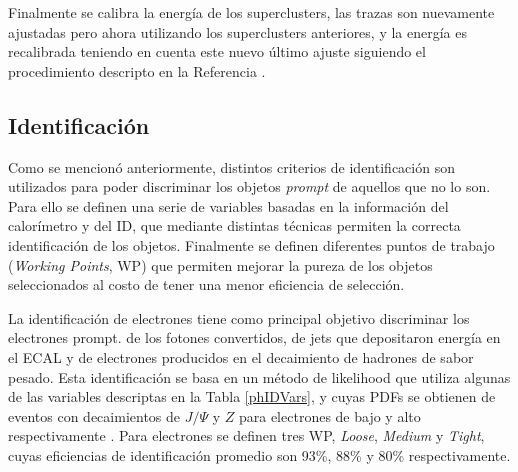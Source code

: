 Finalmente se calibra la energía de los superclusters, las trazas son nuevamente ajustadas pero ahora utilizando los superclusters anteriores, y la energía es recalibrada teniendo en cuenta este nuevo último ajuste siguiendo el procedimiento descripto en la Referencia \cite{PERF-2017-03}.


\subsection{Identificación}

Como se mencionó anteriormente, distintos criterios de identificación son utilizados para poder discriminar los objetos \textit{prompt}
de aquellos que no lo son. Para ello se definen una serie de variables basadas en la información del calorímetro y del ID, que mediante distintas técnicas permiten la correcta identificación de los objetos. Finalmente se definen diferentes puntos de trabajo (\textit{Working Points}, WP) que permiten mejorar la pureza de los objetos seleccionados al costo de tener una menor eficiencia de selección.

La identificación de electrones tiene como principal objetivo discriminar los electrones prompt.  de los fotones convertidos, de jets que depositaron energía en el ECAL y de electrones producidos en el decaimiento de hadrones de sabor pesado. Esta identificación se basa en un método de likelihood que utiliza algunas de las variables descriptas en la Tabla \ref{phIDVars}, y cuyas PDFs se obtienen de eventos con decaimientos de $J/\Psi$ y $Z$ para electrones de bajo y alto \ET respectivamente \cite{PERF-2016-01}. Para electrones se definen tres WP, \textit{Loose}, \textit{Medium} y \textit{Tight}, cuyas eficiencias de identificación promedio son  93\%, 88\% y 80\% respectivamente.

